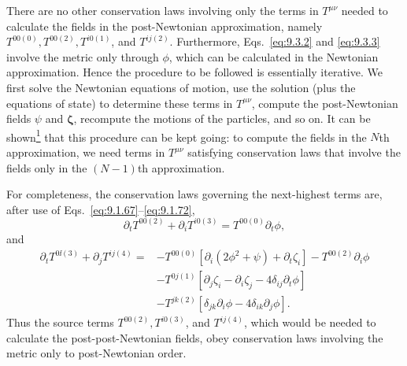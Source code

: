 There are no other conservation laws involving only the terms in
\(T^{\mu\nu}\) needed to calculate the fields in the post-Newtonian
approximation, namely \(T^{00(0)},T^{00(2)},T^{i0(1)}\), and
\(T^{ij(2)}\). Furthermore, Eqs.~\eqref{eq:9.3.2} and
\eqref{eq:9.3.3} involve the metric only through \(\phi\), which can be
calculated in the Newtonian approximation. Hence the procedure to be
followed is essentially iterative. We first solve the Newtonian equations of
motion, use the solution (plus the equations of state) to determine these
terms in \(T^{\mu\nu}\), compute the post-Newtonian fields \(\psi\) and
\(\boldsymbol\zeta\), recompute the motions of the particles, and so on. It
can be shown\hyperref[ch9-ref-1]{\textsuperscript{1}} that this procedure can
be kept going: to compute the fields in the \(N\)th approximation, we need
terms in \(T^{\mu\nu}\) satisfying conservation laws that involve the
fields only in the \((N-1)\)th approximation.

For completeness, the conservation laws governing the next-highest terms
are, after use of Eqs.~\eqref{eq:9.1.67}--\eqref{eq:9.1.72},
\begin{equation}
  \partial_tT^{00(2)}+\partial_iT^{i0(3)}
  =
  T^{00(0)}\partial_t\phi,
  \tag{9.3.4}\label{eq:9.3.4}
\end{equation}
and
\begin{equation}
  \begin{split}
  \partial_tT^{0\ii(3)}+\partial_jT^{ij(4)}
  ={}&
  -T^{00(0)}
   \left[\partial_i(2\phi^2+\psi)+\partial_t\zeta_i\right]
  -T^{00(2)}\partial_i\phi\\
  &-T^{0j(1)}
   \left[
     \partial_j\zeta_i-\partial_i\zeta_j
     -4\delta_{ij}\partial_t\phi
   \right]\\
  &-T^{jk(2)}
   \left[
     \delta_{jk}\partial_i\phi
     -4\delta_{ik}\partial_j\phi
   \right].
  \end{split}
  \tag{9.3.5}\label{eq:9.3.5}
\end{equation}
Thus the source terms \(T^{00(2)},T^{i0(3)}\), and \(T^{ij(4)}\), which
would be needed to calculate the post-post-Newtonian fields, obey
conservation laws involving the metric only to post-Newtonian order.

